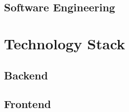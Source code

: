 \subsection{Software Engineering}















\section{Technology Stack}



\subsection{Backend}






\subsection{Frontend}













